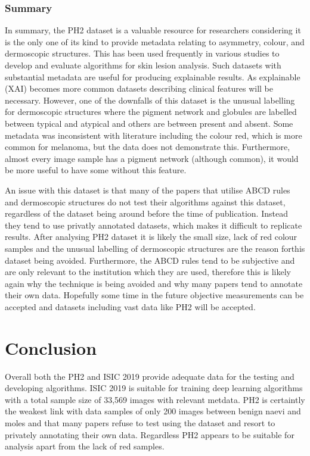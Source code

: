 \subsubsection{Summary}
In summary, the PH2 dataset is a valuable resource for researchers considering it is the only one of its kind to provide metadata relating to asymmetry, colour, and dermoscopic structures. This has been used frequently in various studies to develop and evaluate algorithms for skin lesion analysis. Such datasets with substantial metadata are useful for producing explainable results. As explainable (XAI) becomes more common datasets describing clinical features will be necessary. However, one of the downfalls of this dataset is the unusual labelling for dermoscopic structures where the pigment network and globules are labelled between typical and atypical and others are between present and absent. Some metadata was inconsistent with literature including the colour red, which is more common for melanoma, but the data does not demonstrate this. Furthermore, almost every image sample has a pigment network (although common), it would be more useful to have some without this feature.

An issue with this dataset is that many of the papers that utilise ABCD rules and dermoscopic structures do not test their algorithms against this dataset, regardless of the dataset being around before the time of publication\cite{Kasmi2016, She2007, Tenenhaus2010, Ramezani2014, Zaqout2016}. Instead they tend to use privatly annotated datasets, which makes it difficult to replicate results. After analysing PH2 dataset it is likely the small size, lack of red colour samples and the unusual labelling of dermoscopic structures are the reason forthis dataset being avoided. Furthermore, the ABCD rules tend to be subjective and are only relevant to the institution which they are used, therefore this is likely again why the technique is being avoided and why many papers tend to annotate their own data. Hopefully some time in the future objective measurements can be accepted and datasets including vast data like PH2 will be accepted.

\section{Conclusion}
Overall both the PH2 and ISIC 2019 provide adequate data for the testing and developing algorithms. ISIC 2019 is suitable for training deep learning algorithms with a total sample size of 33,569 images with relevant metdata. PH2 is certaintly the weakest link with data samples of only 200 images between benign naevi and moles and that many papers refuse to test using the dataset and resort to privately annotating their
own data. Regardless PH2 appears to be suitable for analysis apart from the lack of red samples.

